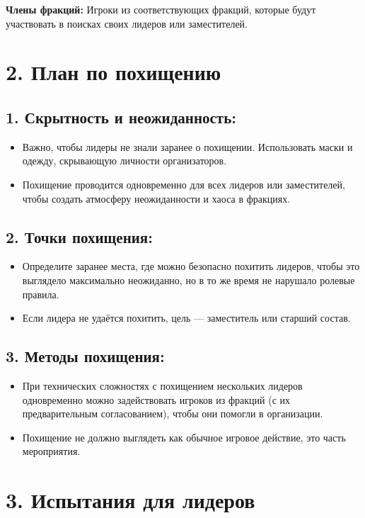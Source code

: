\documentclass[12pt]{article}
\begin{document}
\textbf{Члены фракций:}  
Игроки из соответствующих фракций, которые будут участвовать в поисках своих лидеров или заместителей.

\section*{2. План по похищению}

\subsection*{1. Скрытность и неожиданность:}
\begin{itemize}
    \item Важно, чтобы лидеры не знали заранее о похищении. Использовать маски и одежду, скрывающую личности организаторов.
    \item Похищение проводится одновременно для всех лидеров или заместителей, чтобы создать атмосферу неожиданности и хаоса в фракциях.
\end{itemize}

\subsection*{2. Точки похищения:}
\begin{itemize}
    \item Определите заранее места, где можно безопасно похитить лидеров, чтобы это выглядело максимально неожиданно, но в то же время не нарушало ролевые правила.
    \item Если лидера не удаётся похитить, цель — заместитель или старший состав.
\end{itemize}

\subsection*{3. Методы похищения:}
\begin{itemize}
    \item При технических сложностях с похищением нескольких лидеров одновременно можно задействовать игроков из фракций (с их предварительным согласованием), чтобы они помогли в организации.
    \item Похищение не должно выглядеть как обычное игровое действие, это часть мероприятия.
\end{itemize}

\section*{3. Испытания для лидеров}
\end{document}
